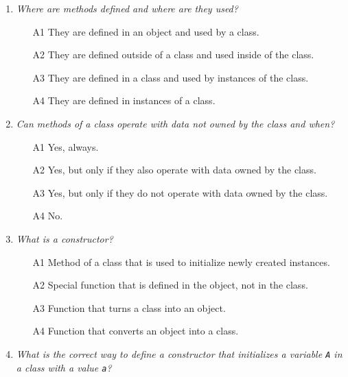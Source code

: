 \begin{enumerate}
\item {\em Where are methods defined and where are they used?}\\

\begin{enumerate}
\item[A1] They are defined in an object and used by a class.
\item[A2] They are defined outside of a class and used inside of the class.
\item[A3] They are defined in a class and used by instances of the class.
\item[A4] They are defined in instances of a class.
\end{enumerate}

\vspace{6mm}

\item {\em Can methods of a class operate with data not owned by the class and when?}\\

\begin{enumerate}
\item[A1] Yes, always.
\item[A2] Yes, but only if they also operate with data owned by the class.
\item[A3] Yes, but only if they do not operate with data owned by the class.
\item[A4] No.
\end{enumerate}

\vspace{6mm}

\item {\em What is a {\em constructor}?}\\

\begin{enumerate}
\item[A1] Method of a class that is used to initialize newly created instances.
\item[A2] Special function that is defined in the object, not in the class.
\item[A3] Function that turns a class into an object.
\item[A4] Function that converts an object into a class.
\end{enumerate}

\vspace{6mm}

\item {\em What is the correct way to define a constructor that initializes a variable
      {\tt A} in a class with a value {\tt a}?}\\


\end{enumerate}
